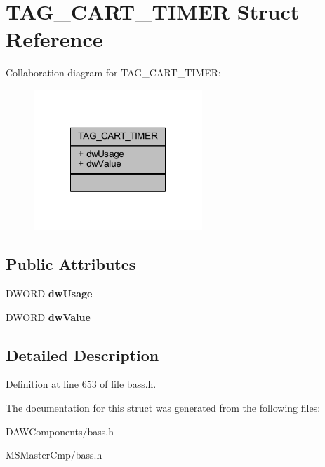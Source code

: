 \hypertarget{struct_t_a_g___c_a_r_t___t_i_m_e_r}{\section{T\-A\-G\-\_\-\-C\-A\-R\-T\-\_\-\-T\-I\-M\-E\-R Struct Reference}
\label{struct_t_a_g___c_a_r_t___t_i_m_e_r}
}


Collaboration diagram for T\-A\-G\-\_\-\-C\-A\-R\-T\-\_\-\-T\-I\-M\-E\-R\-:\nopagebreak
\begin{figure}[H]
\begin{center}
\leavevmode
\includegraphics[width=180pt]{struct_t_a_g___c_a_r_t___t_i_m_e_r__coll__graph}
\end{center}
\end{figure}
\subsection*{Public Attributes}
\begin{DoxyCompactItemize}
\item 
\hypertarget{struct_t_a_g___c_a_r_t___t_i_m_e_r_aa40808e77b3759fe9126c02f027271d9_aa40808e77b3759fe9126c02f027271d9}{D\-W\-O\-R\-D {\bfseries dw\-Usage}}\label{struct_t_a_g___c_a_r_t___t_i_m_e_r_aa40808e77b3759fe9126c02f027271d9_aa40808e77b3759fe9126c02f027271d9}

\item 
\hypertarget{struct_t_a_g___c_a_r_t___t_i_m_e_r_aa5bbaed34d05a4febf635a1a46fe72b0_aa5bbaed34d05a4febf635a1a46fe72b0}{D\-W\-O\-R\-D {\bfseries dw\-Value}}\label{struct_t_a_g___c_a_r_t___t_i_m_e_r_aa5bbaed34d05a4febf635a1a46fe72b0_aa5bbaed34d05a4febf635a1a46fe72b0}

\end{DoxyCompactItemize}


\subsection{Detailed Description}


Definition at line 653 of file bass.\-h.



The documentation for this struct was generated from the following files\-:\begin{DoxyCompactItemize}
\item 
D\-A\-W\-Components/bass.\-h\item 
M\-S\-Master\-Cmp/bass.\-h\end{DoxyCompactItemize}
